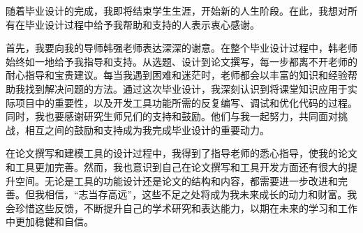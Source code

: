 
\acknowledgement

随着毕业设计的完成，我即将结束学生生涯，开始新的人生阶段。在此，我想对所有在毕业设计过程中给予我帮助和支持的人表示衷心感谢。

首先，我要向我的导师韩强老师表达深深的谢意。在整个毕业设计过程中，韩老师始终如一地给予我指导和支持。从选题、设计到论文撰写，每一步都离不开老师的耐心指导和宝贵建议。每当我遇到困难和迷茫时，老师都会以丰富的知识和经验帮助我找到解决问题的方法。通过这次毕业设计，我深刻认识到将课堂知识应用于实际项目中的重要性，以及开发工具功能所需的反复编写、调试和优化代码的过程。同时，我也要感谢研究生师兄们的支持和鼓励。他们与我一起努力，共同面对挑战，相互之间的鼓励和支持成为我完成毕业设计的重要动力。

在论文撰写和建模工具的设计过程中，我得到了指导老师的悉心指导，使我的论文和工具更加完善。然而，我也意识到自己在论文撰写和工具开发方面还有很大的提升空间。无论是工具的功能设计还是论文的结构和内容，都需要进一步改进和完善。但我相信，“志当存高远”，这些不足之处将成为我未来成长的动力和财富。我会珍惜这些反馈，不断提升自己的学术研究和表达能力，以期在未来的学习和工作中更加稳健和自信。
